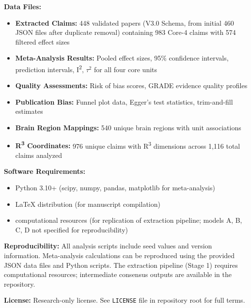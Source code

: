 \documentclass[9pt,onecolumn]{article}
\begin{document}
\textbf{Data Files:}
\begin{itemize}[leftmargin=*, topsep=2pt, itemsep=1pt]
\item \textbf{Extracted Claims:} 448 validated papers (V3.0 Schema, from initial 460 JSON files after duplicate removal) containing 983 Core-4 claims with 574 filtered effect sizes
\item \textbf{Meta-Analysis Results:} Pooled effect sizes, 95\% confidence intervals, prediction intervals, I\textsuperscript{2}, $\tau^2$ for all four core units
\item \textbf{Quality Assessments:} Risk of bias scores, GRADE evidence quality profiles
\item \textbf{Publication Bias:} Funnel plot data, Egger's test statistics, trim-and-fill estimates
\item \textbf{Brain Region Mappings:} 540 unique brain regions with unit associations
\item \textbf{R\textsuperscript{3} Coordinates:} 976 unique claims with R\textsuperscript{3} dimensions across 1,116 total claims analyzed
\end{itemize}

\textbf{Software Requirements:}
\begin{itemize}[leftmargin=*, topsep=2pt, itemsep=1pt]
\item Python 3.10+ (scipy, numpy, pandas, matplotlib for meta-analysis)
\item LaTeX distribution (for manuscript compilation)
\item computational resources (for replication of extraction pipeline; models A, B, C, D not specified for reproducibility)
\end{itemize}

\textbf{Reproducibility:} All analysis scripts include seed values and version information. Meta-analysis calculations can be reproduced using the provided JSON data files and Python scripts. The extraction pipeline (Stage 1) requires computational resources; intermediate consensus outputs are available in the repository.

\textbf{License:} Research-only license. See \texttt{LICENSE} file in repository root for full terms.

\end{document}
